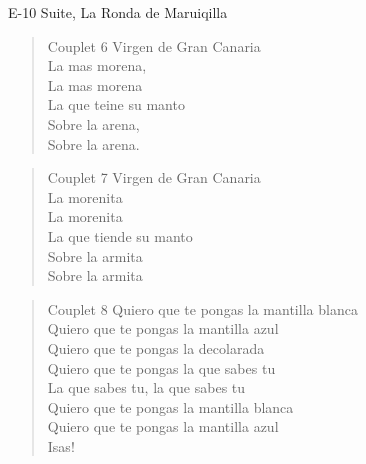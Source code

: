 \begin{song}[vals]{E-10 Suite, La Ronda de Maruiqilla}
\begin{verse}{Couplet 6}
Virgen de Gran Canaria\\
\chord{}La mas morena,\\
La mas morena\\
La que teine su manto\\
\chord{}Sobre la arena,\\
Sobre la arena.\
\end{verse}

\begin{verse}{Couplet 7}
Virgen de Gran Canaria\\
\chord{}La morenita\\
La morenita\\
La que tiende su manto\\
\chord{}Sobre la armita\\
Sobre la armita\\
\end{verse}

\begin{verse}{Couplet 8}
\chord{}Quiero que te pongas la mantilla blanca\\
Quiero que te pongas la mantilla azul\\
\chord{}Quiero que te pongas la decolarada\\
Quiero que te pongas la que sabes tu\\
La que sabes tu, la que sabes tu\\
\chord{}Quiero que te pongas la mantilla blanca\\
Quiero que te pongas la mantilla azul\\
\chord{}Isas!\hspace{1em}\hspace{1em}
\end{verse}
\end{song}
